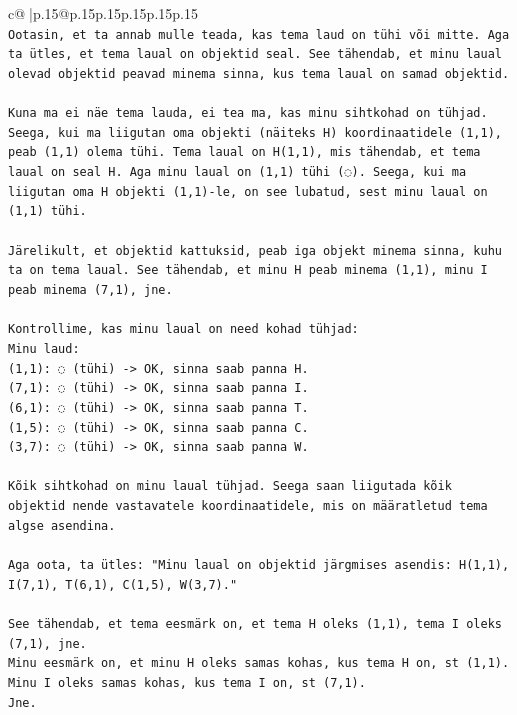 \documentclass{article}
\begin{document}
{\begin{supertabular}{c@{$\;$}|p{.15\linewidth}@{}p{.15\linewidth}p{.15\linewidth}p{.15\linewidth}p{.15\linewidth}p{.15\linewidth}}
{{{\\ 
\texttt{Ootasin, et ta annab mulle teada, kas tema laud on tühi või mitte. Aga ta ütles, et tema laual on objektid seal. See tähendab, et minu laual olevad objektid peavad minema sinna, kus tema laual on samad objektid.} \\
\\ 
\texttt{Kuna ma ei näe tema lauda, ei tea ma, kas minu sihtkohad on tühjad. Seega, kui ma liigutan oma objekti (näiteks H) koordinaatidele (1,1), peab (1,1) olema tühi. Tema laual on H(1,1), mis tähendab, et tema laual on seal H. Aga minu laual on (1,1) tühi (◌). Seega, kui ma liigutan oma H objekti (1,1){-}le, on see lubatud, sest minu laual on (1,1) tühi.} \\
\\ 
\texttt{Järelikult, et objektid kattuksid, peab iga objekt minema sinna, kuhu ta on tema laual. See tähendab, et minu H peab minema (1,1), minu I peab minema (7,1), jne.} \\
\\ 
\texttt{Kontrollime, kas minu laual on need kohad tühjad:} \\
\texttt{Minu laud:} \\
\texttt{(1,1): ◌ (tühi) {-}> OK, sinna saab panna H.} \\
\texttt{(7,1): ◌ (tühi) {-}> OK, sinna saab panna I.} \\
\texttt{(6,1): ◌ (tühi) {-}> OK, sinna saab panna T.} \\
\texttt{(1,5): ◌ (tühi) {-}> OK, sinna saab panna C.} \\
\texttt{(3,7): ◌ (tühi) {-}> OK, sinna saab panna W.} \\
\\ 
\texttt{Kõik sihtkohad on minu laual tühjad. Seega saan liigutada kõik objektid nende vastavatele koordinaatidele, mis on määratletud tema algse asendina.} \\
\\ 
\texttt{Aga oota, ta ütles: "Minu laual on objektid järgmises asendis: H(1,1), I(7,1), T(6,1), C(1,5), W(3,7)."} \\
\\ 
\texttt{See tähendab, et tema eesmärk on, et tema H oleks (1,1), tema I oleks (7,1), jne.} \\
\texttt{Minu eesmärk on, et minu H oleks samas kohas, kus tema H on, st (1,1).} \\
\texttt{Minu I oleks samas kohas, kus tema I on, st (7,1).} \\
\texttt{Jne.} \\
}}}
\end{supertabular}}
\end{document}
